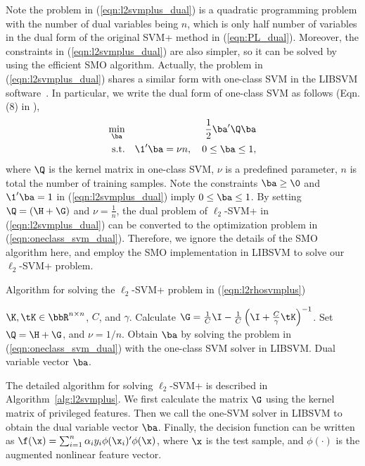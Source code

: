 Note the problem in (\ref{eqn:l2svmplus_dual}) is a quadratic programming problem with the number of dual variables being $n$, which is only half number of variables in the dual form of the original SVM+ method in (\ref{eqn:PL_dual}). Moreover, the constraints in (\ref{eqn:l2svmplus_dual}) are also simpler, so it can be solved by using the efficient SMO algorithm. Actually, the problem in (\ref{eqn:l2svmplus_dual}) shares a similar form with one-class SVM in the LIBSVM software~\cite{libsvm}. In particular, we write the dual form of one-class SVM as follows (Eqn. (8) in \cite{libsvm}),
\begin{eqnarray}\label{eqn:oneclass_svm_dual}
\min_{\ba} && \frac{1}{2}\ba'\Q\ba\\
\mbox{s.t.} && \1'\ba = \nu n, \quad 0\leq \ba \leq 1\nonumber,
\end{eqnarray}
where $\Q$ is the kernel matrix in one-class SVM, $\nu$ is a predefined parameter, $n$ is total the number of training samples.  Note the constraints $\ba \geq \0$ and $\1'\ba = 1$ in (\ref{eqn:l2svmplus_dual}) imply $0 \leq \ba \leq 1$. By setting $\Q = (\H + \G)$ and $\nu =  \frac{1}{n}$, the dual problem of $\ell_2$-SVM+ in (\ref{eqn:l2svmplus_dual}) can be converted to the optimization problem in (\ref{eqn:oneclass_svm_dual}). Therefore, we ignore the details of the SMO algorithm here, and employ the SMO implementation in LIBSVM to solve our $\ell_2$-SVM+ problem.

\begin{algorithm}[t]
   \caption{Algorithm for solving the $\ell_2$-SVM+ problem in (\ref{eqn:l2rhosvmplus})}
   \label{alg:l2svmplus}
   \begin{algorithmic}[1]
   \REQUIRE  $\K, \tK \in \bbR^{n\times n}$, $C$, and $\gamma$.
   \STATE Calculate $\G = \frac{1}{C}\I - \frac{1}{C}\left(\I+\frac{C}{\gamma}\tK\right)^{-1}$.
   \STATE Set $\Q = \H + \G$, and $\nu = 1/n$.
   \STATE Obtain $\ba$ by solving the problem in (\ref{eqn:oneclass_svm_dual}) with the one-class SVM solver in LIBSVM.
   \ENSURE Dual variable vector $\ba$.
\end{algorithmic}
\end{algorithm}

The detailed algorithm for solving $\ell_2$-SVM+ is described in Algorithm~\ref{alg:l2svmplus}. We first calculate the matrix $\G$ using the kernel matrix of privileged features. Then we call the one-SVM solver in LIBSVM to obtain the dual variable vector $\ba$. Finally, the decision function can be written as $\f(\x) = \sum_{i=1}^n\alpha_iy_i\phi(\x_i)'\phi(\x)$, where $\x$ is the test sample, and $\phi(\cdot)$ is the augmented nonlinear feature vector.

